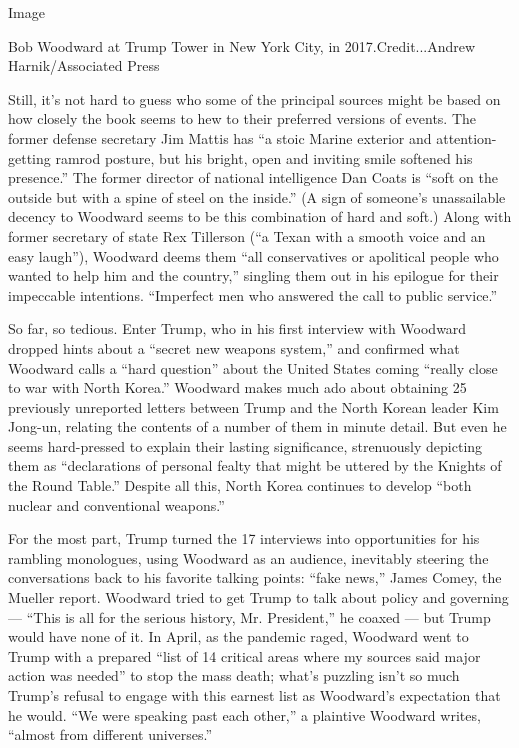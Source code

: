 Image

Bob Woodward at Trump Tower in New York City, in 2017.Credit...Andrew
Harnik/Associated Press

Still, it's not hard to guess who some of the principal sources might be
based on how closely the book seems to hew to their preferred versions
of events. The former defense secretary Jim Mattis has ``a stoic Marine
exterior and attention-getting ramrod posture, but his bright, open and
inviting smile softened his presence.'' The former director of national
intelligence Dan Coats is ``soft on the outside but with a spine of
steel on the inside.'' (A sign of someone's unassailable decency to
Woodward seems to be this combination of hard and soft.) Along with
former secretary of state Rex Tillerson (``a Texan with a smooth voice
and an easy laugh''), Woodward deems them ``all conservatives or
apolitical people who wanted to help him and the country,'' singling
them out in his epilogue for their impeccable intentions. ``Imperfect
men who answered the call to public service.''

So far, so tedious. Enter Trump, who in his first interview with
Woodward dropped hints about a ``secret new weapons system,'' and
confirmed what Woodward calls a ``hard question'' about the United
States coming ``really close to war with North Korea.'' Woodward makes
much ado about obtaining 25 previously unreported letters between Trump
and the North Korean leader Kim Jong-un, relating the contents of a
number of them in minute detail. But even he seems hard-pressed to
explain their lasting significance, strenuously depicting them as
``declarations of personal fealty that might be uttered by the Knights
of the Round Table.'' Despite all this, North Korea continues to develop
``both nuclear and conventional weapons.''

For the most part, Trump turned the 17 interviews into opportunities for
his rambling monologues, using Woodward as an audience, inevitably
steering the conversations back to his favorite talking points: ``fake
news,'' James Comey, the Mueller report. Woodward tried to get Trump to
talk about policy and governing --- ``This is all for the serious
history, Mr. President,'' he coaxed --- but Trump would have none of it.
In April, as the pandemic raged, Woodward went to Trump with a prepared
``list of 14 critical areas where my sources said major action was
needed'' to stop the mass death; what's puzzling isn't so much Trump's
refusal to engage with this earnest list as Woodward's expectation that
he would. ``We were speaking past each other,'' a plaintive Woodward
writes, ``almost from different universes.''

